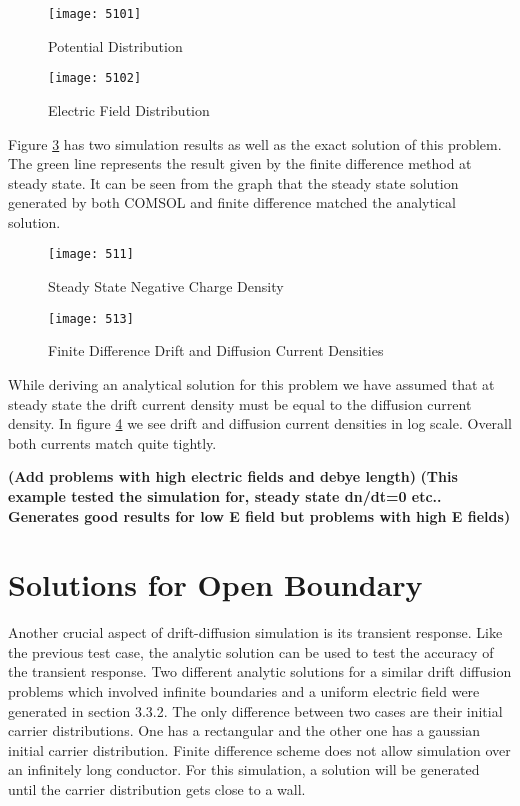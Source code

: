 \begin{figure}
\centering
\texttt{[image: 5101]}
\caption{Potential Distribution} 
\label{5pot}
\end{figure}

\begin{figure}
\centering
\texttt{[image: 5102]}
\caption{Electric Field Distribution} 
\label{5E}
\end{figure}

\clearpage

Figure  \ref{5ss} has two simulation results as well as the exact solution of this problem. The green line represents the result given by the finite difference method at steady state. It can be seen from the graph that the steady state solution generated by both COMSOL and finite difference matched the analytical solution.

\begin{figure}
\centering
\texttt{[image: 511]}
\caption{Steady State Negative Charge Density} 
\label{5ss}
\end{figure}

\begin{figure}[!htp]
\centering
\texttt{[image: 513]}
\caption{Finite Difference Drift and Diffusion Current Densities}
 \label{5curdens}
\end{figure}

While deriving an analytical solution for this problem we have assumed that at steady state the drift current density must be equal to the diffusion current density. In figure \ref{5curdens} we see drift and diffusion current densities in log scale. Overall both currents match quite tightly.

\textbf{(Add problems with high electric fields and debye length)}
\newline
\textbf{(This example tested the simulation for, steady state dn/dt=0 etc.. Generates good results for low E field but problems with high E fields)}

\clearpage
\section{Solutions for Open Boundary}
Another crucial aspect of drift-diffusion simulation is its transient response. Like the previous test case, the analytic solution can be used to test the accuracy of the transient response. Two different analytic solutions for a similar drift diffusion problems which involved infinite boundaries and a uniform electric field were generated in section 3.3.2. The only difference between two cases are their initial carrier distributions. One has a rectangular and the other one has a gaussian initial carrier distribution. Finite difference scheme does not allow simulation over an infinitely long conductor. For this simulation, a solution will be generated until the carrier distribution gets close to a wall.   

